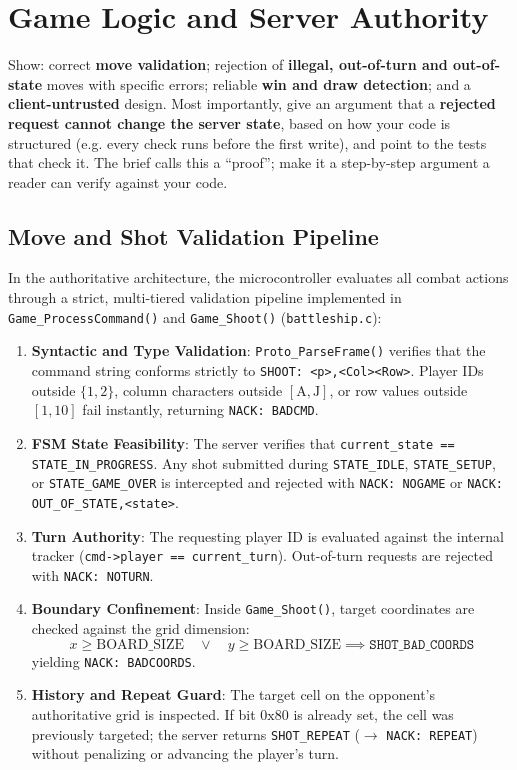 \section{Game Logic and Server Authority}
\label{sec:authority}

\begin{guidance}
Show: correct \textbf{move validation}; rejection of \textbf{illegal,
out-of-turn and out-of-state} moves with specific errors; reliable
\textbf{win and draw detection}; and a \textbf{client-untrusted} design. Most
importantly, give an argument that a \textbf{rejected request cannot change the
server state}, based on how your code is structured (e.g. every check runs
before the first write), and point to the tests that check it. The brief calls
this a ``proof''; make it a step-by-step argument a reader can verify against
your code.
\end{guidance}

\subsection{Move and Shot Validation Pipeline}
In the authoritative architecture, the microcontroller evaluates all combat actions through a strict, multi-tiered validation pipeline implemented in \texttt{Game\_ProcessCommand()} and \texttt{Game\_Shoot()} (\texttt{battleship.c}):
\begin{enumerate}
    \item \textbf{Syntactic and Type Validation}: \texttt{Proto\_ParseFrame()} verifies that the command string conforms strictly to \texttt{SHOOT: <p>,<Col><Row>}. Player IDs outside $\{1, 2\}$, column characters outside $[\text{A}, \text{J}]$, or row values outside $[1, 10]$ fail instantly, returning \texttt{NACK: BADCMD}.
    \item \textbf{FSM State Feasibility}: The server verifies that \texttt{current\_state == STATE\_IN\_PROGRESS}. Any shot submitted during \texttt{STATE\_IDLE}, \texttt{STATE\_SETUP}, or \texttt{STATE\_GAME\_OVER} is intercepted and rejected with \texttt{NACK: NOGAME} or \texttt{NACK: OUT\_OF\_STATE,<state>}.
    \item \textbf{Turn Authority}: The requesting player ID is evaluated against the internal tracker (\texttt{cmd->player == current\_turn}). Out-of-turn requests are rejected with \texttt{NACK: NOTURN}.
    \item \textbf{Boundary Confinement}: Inside \texttt{Game\_Shoot()}, target coordinates are checked against the grid dimension:
    \begin{equation}
    x \ge \text{BOARD\_SIZE} \quad \lor \quad y \ge \text{BOARD\_SIZE} \implies \texttt{SHOT\_BAD\_COORDS}
    \end{equation}
    yielding \texttt{NACK: BADCOORDS}.
    \item \textbf{History and Repeat Guard}: The target cell on the opponent's authoritative grid is inspected. If bit $0\text{x}80$ is already set, the cell was previously targeted; the server returns \texttt{SHOT\_REPEAT} ($\to$ \texttt{NACK: REPEAT}) without penalizing or advancing the player's turn.
\end{enumerate}

